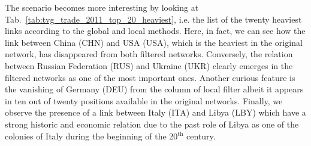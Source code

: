 \documentclass[aps,twocolumn,superscriptaddress]{revtex4-1}
\begin{document}
The scenario becomes more interesting by looking at Tab.~\ref{tab:tvg_trade_2011_top_20_heaviest}, i.e. the list of the twenty heaviest links according to the global and local methods. Here, in fact, we can see how the link between China (CHN) and USA (USA), which is the heaviest in the original network, has disappeared from both filtered networks. Conversely, the relation between Russian Federation (RUS) and Ukraine (UKR) clearly emerges in the filtered networks as one of the most important ones. Another curious feature is the vanishing of Germany (DEU) from the column of local filter albeit it appears in ten out of twenty positions available in the original networks. Finally, we observe the presence of a link between Italy (ITA) and Libya (LBY) which have a strong historic and economic relation due to the past role of Libya as one of the colonies of Italy during the beginning of the 20$^{\text{th}}$ century.
\end{document}
